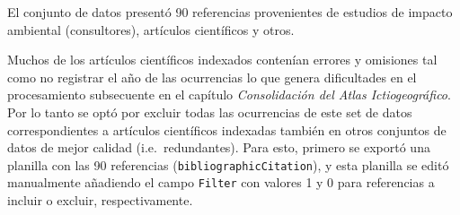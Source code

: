 \documentclass[sn-apa,pdflatex]{sn-jnl}
\newenvironment{Shaded}{\begin{snugshade}}{\end{snugshade}}
\newcommand{\AttributeTok}[1]{\textcolor[rgb]{0.13,0.29,0.53}{#1}}
\newcommand{\CommentTok}[1]{\textcolor[rgb]{0.56,0.35,0.01}{\textit{#1}}}
\newcommand{\FunctionTok}[1]{\textcolor[rgb]{0.13,0.29,0.53}{\textbf{#1}}}
\newcommand{\NormalTok}[1]{#1}
\newcommand{\SpecialCharTok}[1]{\textcolor[rgb]{0.81,0.36,0.00}{\textbf{#1}}}
\newcommand{\StringTok}[1]{\textcolor[rgb]{0.31,0.60,0.02}{#1}}
\begin{document}
\begin{Shaded}
\end{Shaded}

El conjunto de datos presentó 90 referencias provenientes de estudios de
impacto ambiental (consultores), artículos científicos y otros.

Muchos de los artículos científicos indexados contenían errores y
omisiones tal como no registrar el año de las ocurrencias lo que genera
dificultades en el procesamiento subsecuente en el capítulo
\emph{Consolidación del Atlas Ictiogeográfico}. Por lo tanto se optó por
excluir todas las ocurrencias de este set de datos correspondientes a
artículos científicos indexadas también en otros conjuntos de datos de
mejor calidad (i.e.~redundantes). Para esto, primero se exportó una
planilla con las 90 referencias (\texttt{bibliographicCitation}), y esta
planilla se editó manualmente añadiendo el campo \texttt{Filter} con
valores 1 y 0 para referencias a incluir o excluir, respectivamente.
\end{document}
